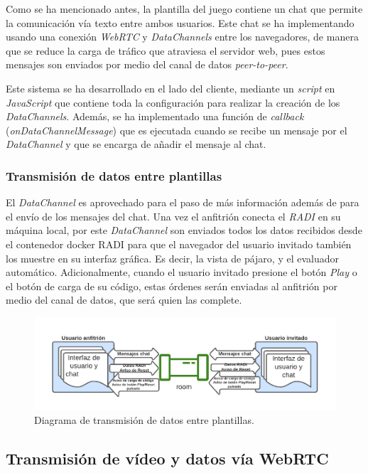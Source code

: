 \documentclass[a4paper, 12pt]{book}
\begin{document}
Como se ha mencionado antes, la plantilla del juego contiene un chat que permite la comunicación vía texto entre ambos usuarios. Este chat se ha implementando usando una conexión \emph{WebRTC} y \emph{DataChannels} entre los navegadores, de manera que se reduce la carga de tráfico que atraviesa el servidor web, pues estos mensajes son enviados por medio del canal de datos \emph{peer-to-peer}.

Este sistema se ha desarrollado en el lado del cliente, mediante un \emph{script} en \emph{JavaScript} que contiene toda la configuración para realizar la creación de los \emph{DataChannels}. Además, se ha implementado una función de \emph{callback} (\emph{onDataChannelMessage}) que es ejecutada cuando se recibe un mensaje por el \emph{DataChannel} y que se encarga de añadir el mensaje al chat.

\subsubsection{Transmisión de datos entre plantillas}

El \emph{DataChannel} es aprovechado para el paso de más información además de para el envío de los mensajes del chat. Una vez el anfitrión conecta el \emph{RADI} en su máquina local, por este \emph{DataChannel} son enviados todos los datos recibidos desde el contenedor docker RADI para que el navegador del usuario invitado también los muestre en su interfaz gráfica. Es decir, la vista de pájaro, y el evaluador automático. Adicionalmente, cuando el usuario invitado presione el botón \emph{Play} o el botón de carga de su código, estas órdenes serán enviadas al anfitrión por medio del canal de datos, que será quien las complete.

\begin{figure}[H]
	\centering
    \includegraphics[width=15cm]{img/transmision_datos.png}
    \caption{Diagrama de transmisión de datos entre plantillas.}
    \label{figura:diagrama_conexion_webrtc}
\end{figure}

\subsection{Transmisión de vídeo y datos vía WebRTC}
\end{document}
